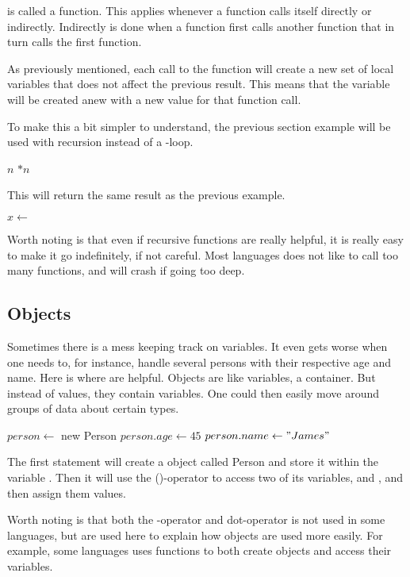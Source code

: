  is called a  function. This applies whenever a function calls itself directly or indirectly. Indirectly is done when a function first calls another function that in turn calls the first function.

As previously mentioned, each call to the function will create a new set of local variables that does not affect the previous result. This means that the variable  will be created anew with a new value for that function call.

To make this a bit simpler to understand, the previous section example will be used with recursion instead of a -loop.

\begin{algorithm}[H]
	\begin{algorithmic}[1]
				\Return $n$
			\EndIf
			\Return {}$ * n$
		\EndFunction
	\end{algorithmic}
\end{algorithm}

This will return the same result as the previous example.

\begin{algorithm}[H]
	\begin{algorithmic}[1]
		\State $x \gets$ 
	\end{algorithmic}
\end{algorithm}

Worth noting is that even if recursive functions are really helpful, it is really easy to make it go indefinitely, if not careful. Most languages does not like to call too many functions, and will crash if going too deep.

\subsection{Objects}

Sometimes there is a mess keeping track on variables. It even gets worse when one needs to, for instance, handle several persons with their respective age and name. Here is where  are helpful.
Objects are like variables, a container. But instead of values, they contain variables. One could then easily move around groups of data about certain types.

\begin{algorithm}[H]
	\begin{algorithmic}[1]
		\State $person \gets$ new Person
		\State $person.age \gets 45$
		\State $person.name \gets "James"$
	\end{algorithmic}
\end{algorithm}

The first statement will create a  object called Person and store it within the variable . Then it will use the ()-operator to access two of its variables,  and , and then assign them values.

Worth noting is that both the -operator and dot-operator is not used in some languages, but are used here to explain how objects are used more easily. For example, some languages uses functions to both create objects and access their variables.
